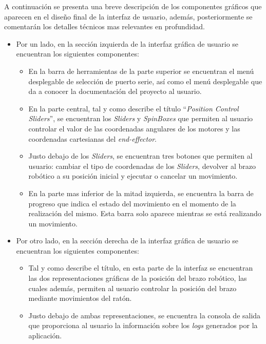 A continuación se presenta una breve descripción de los componentes gráficos que aparecen en el diseño final de la interfaz de usuario, además, posteriormente se comentarán los detalles técnicos mas relevantes en profundidad.
\begin{itemize}
    \item Por un lado, en la sección izquierda de la interfaz gráfica de usuario se encuentran los siguientes componentes:
    \begin{itemize}
        \item En la barra de herramientas de la parte superior se encuentran el menú desplegable de selección de puerto serie, así como el menú desplegable que da a conocer la documentación del proyecto al usuario.
        \item En la parte central, tal y como describe el título ``\textit{Position Control Sliders}'', se encuentran los \textit{Sliders} y \textit{SpinBoxes} que permiten al usuario controlar el valor de las coordenadas angulares de los motores y las coordenadas cartesianas del \textit{end-effector}.
        \item Justo debajo de los \textit{Sliders}, se encuentran tres botones que permiten al usuario: cambiar el tipo de coordenadas de los \textit{Sliders}, devolver al brazo robótico a su posición inicial y ejecutar o cancelar un movimiento.
        \item En la parte mas inferior de la mitad izquierda, se encuentra la barra de progreso que indica el estado del movimiento en el momento de la realización del mismo. Esta barra solo aparece mientras se está realizando un movimiento.
    \end{itemize}
    \item Por otro lado, en la sección derecha de la interfaz gráfica de usuario se encuentran los siguientes componentes:
    \begin{itemize}
        \item Tal y como describe el título, en esta parte de la interfaz se encuentran las dos representaciones gráficas de la posición del brazo robótico, las cuales además, permiten al usuario controlar la posición del brazo mediante movimientos del ratón.
        \item Justo debajo de ambas representaciones, se encuentra la consola de salida que proporciona al usuario la información sobre los \textit{logs} generados por la aplicación.
    \end{itemize}
\end{itemize}

